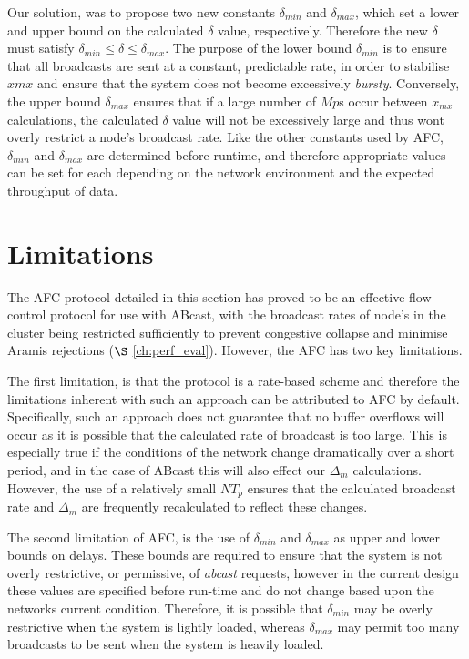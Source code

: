     Our solution, was to propose two new constants $\delta_{min}$ and $\delta_{max}$, which set a lower and upper bound on the calculated $\delta$ value, respectively.  Therefore the new $\delta$ must satisfy $\delta_{min} \leq \delta \leq \delta_{max}$.  The purpose of the lower bound $\delta_{min}$ is to ensure that all broadcasts are sent at a constant, predictable rate, in order to stabilise $x{mx}$ and ensure that the system does not become excessively \emph{bursty}.  Conversely, the upper bound $\delta_{max}$ ensures that if a large number of $Mp$s occur between $x_{mx}$ calculations, the calculated $\delta$ value will not be excessively large and thus wont overly restrict a node's broadcast rate.  Like the other constants used by AFC, $\delta_{min}$ and $\delta_{max}$ are determined before runtime, and therefore appropriate values can be set for each depending on the network environment and the expected throughput of data. 

\section{Limitations}
    The AFC protocol detailed in this section has proved to be an effective flow control protocol for use with \textsf{ABcast}, with the broadcast rates of node's in the cluster being restricted sufficiently to prevent congestive collapse and minimise \textsf{Aramis} rejections ($\S$ \ref{ch:perf_eval}).  However, the AFC has  two key limitations.   
    
    The first limitation, is that the protocol is a rate-based scheme and therefore the limitations inherent with such an approach can be attributed to AFC by default.  Specifically, such an approach does not guarantee that no buffer overflows will occur as it is possible that the calculated rate of broadcast is too large.  This is especially true if the conditions of the network change dramatically over a short period, and in the case of \textsf{ABcast} this will also effect our $\Delta_m$ calculations.  However, the use of a relatively small $NT_p$ ensures that the calculated broadcast rate and $\Delta_m$ are frequently recalculated to reflect these changes.  
    
    The second limitation of AFC, is the use of $\delta_{min}$ and $\delta_{max}$ as upper and lower bounds on delays.  These bounds are required to ensure that the system is not overly restrictive, or permissive, of \emph{abcast} requests, however in the current design these values are specified before run-time and do not change based upon the networks current condition.  Therefore, it is possible that $\delta_{min}$ may be overly restrictive when the system is lightly loaded, whereas $\delta_{max}$ may permit too many broadcasts to be sent when the system is heavily loaded.  
    
